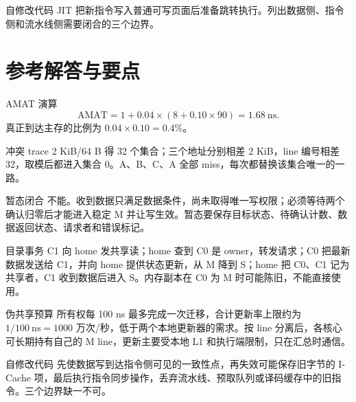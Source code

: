 \begin{chapterexercise}{自修改代码}
JIT 把新指令写入普通可写页面后准备跳转执行。列出数据侧、指令侧和流水线侧需要闭合的三个边界。
\end{chapterexercise}

\section*{参考解答与要点}

\begin{chapteranswer}{AMAT 演算}
\[
\mathrm{AMAT}=1+0.04\times(8+0.10\times90)=1.68\ \mathrm{ns}.
\]
真正到达主存的比例为 $0.04\times0.10=0.4\%$。
\end{chapteranswer}

\begin{chapteranswer}{冲突 trace}
2 KiB/64 B 得 32 个集合；三个地址分别相差 2 KiB，line 编号相差 32，取模后都进入集合 0。A、B、C、A 全部 miss，每次都替换该集合唯一的一路。
\end{chapteranswer}

\begin{chapteranswer}{暂态闭合}
不能。收到数据只满足数据条件，尚未取得唯一写权限；必须等待两个确认归零后才能进入稳定 M 并让写生效。暂态要保存目标状态、待确认计数、数据返回状态、请求者和错误标记。
\end{chapteranswer}

\begin{chapteranswer}{目录事务}
C1 向 home 发共享读；home 查到 C0 是 owner，转发请求；C0 把最新数据发送给 C1，并向 home 提供状态更新，从 M 降到 S；home 把 C0、C1 记为共享者，C1 收到数据后进入 S。内存副本在 C0 为 M 时可能陈旧，不能直接使用。
\end{chapteranswer}

\begin{chapteranswer}{伪共享预算}
所有权每 100 ns 最多完成一次迁移，合计更新率上限约为 $1/100\ \mathrm{ns}=1000$ 万次/秒，低于两个本地更新器的需求。按 line 分离后，各核心可长期持有自己的 M line，更新主要受本地 L1 和执行端限制，只在汇总时通信。
\end{chapteranswer}

\begin{chapteranswer}{自修改代码}
先使数据写到达指令侧可见的一致性点，再失效可能保存旧字节的 I-Cache 项，最后执行指令同步操作，丢弃流水线、预取队列或译码缓存中的旧指令。三个边界缺一不可。
\end{chapteranswer}
